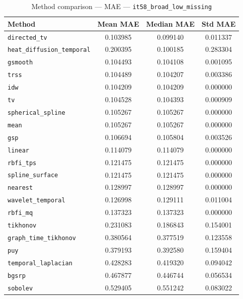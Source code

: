 \begin{table}[ht]
\centering
\caption{Method comparison — MAE — \texttt{it58_broad_low_missing}}
\label{tab:mae_it58_broad_low_missing}
\begin{tabular}{lccc}
\hline
Method & Mean MAE & Median MAE & Std MAE \\
\hline
\texttt{directed_tv} & 0.103985 & 0.099140 & 0.011337 \\
\texttt{heat_diffusion_temporal} & 0.200395 & 0.100185 & 0.283304 \\
\texttt{gsmooth} & 0.104493 & 0.104108 & 0.001095 \\
\texttt{trss} & 0.104489 & 0.104207 & 0.003386 \\
\texttt{idw} & 0.104209 & 0.104209 & 0.000000 \\
\texttt{tv} & 0.104528 & 0.104393 & 0.000909 \\
\texttt{spherical_spline} & 0.105267 & 0.105267 & 0.000000 \\
\texttt{mean} & 0.105267 & 0.105267 & 0.000000 \\
\texttt{gsp} & 0.106694 & 0.105804 & 0.003526 \\
\texttt{linear} & 0.114079 & 0.114079 & 0.000000 \\
\texttt{rbfi_tps} & 0.121475 & 0.121475 & 0.000000 \\
\texttt{spline_surface} & 0.121475 & 0.121475 & 0.000000 \\
\texttt{nearest} & 0.128997 & 0.128997 & 0.000000 \\
\texttt{wavelet_temporal} & 0.126998 & 0.129111 & 0.011004 \\
\texttt{rbfi_mq} & 0.137323 & 0.137323 & 0.000000 \\
\texttt{tikhonov} & 0.231083 & 0.186843 & 0.154001 \\
\texttt{graph_time_tikhonov} & 0.380564 & 0.377519 & 0.123558 \\
\texttt{puy} & 0.379193 & 0.392580 & 0.159404 \\
\texttt{temporal_laplacian} & 0.428283 & 0.419320 & 0.094042 \\
\texttt{bgsrp} & 0.467877 & 0.446744 & 0.056534 \\
\texttt{sobolev} & 0.529405 & 0.551242 & 0.083022 \\
\hline
\end{tabular}
\end{table}
